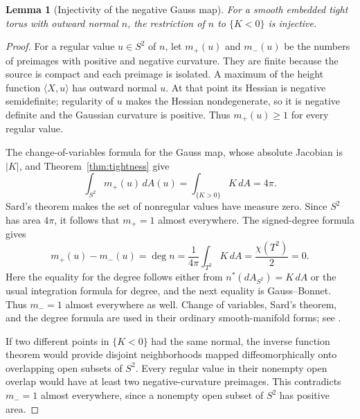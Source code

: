 \documentclass[11pt]{amsart}
\newtheorem{lemma}[theorem]{Lemma}
\theoremstyle{definition}
\begin{document}
\begin{lemma}[Injectivity of the negative Gauss map]\label{lem:gauss}
For a smooth embedded tight torus with outward normal $n$, the
restriction of $n$ to $\{K<0\}$ is injective.
\end{lemma}
\begin{proof}
For a regular value $u\in S^2$ of $n$, let $m_+(u)$ and $m_-(u)$
be the numbers of preimages with positive and negative curvature.
They are finite because the source is compact and each preimage
is isolated. A maximum of the height function $\langle X,u\rangle$
has outward normal $u$. At that point its Hessian is negative
semidefinite; regularity of $u$ makes the Hessian nondegenerate,
so it is negative definite and the Gaussian curvature is positive.
Thus $m_+(u)\ge1$ for every regular value.

The change-of-variables formula for the Gauss map, whose absolute
Jacobian is $|K|$, and Theorem~\ref{thm:tightness} give
\[
 \int_{S^2}m_+(u)\,dA(u)=\int_{\{K>0\}}K\,dA=4\pi .
\]
Sard's theorem makes the set of nonregular values have measure zero.
Since $S^2$ has area $4\pi$, it follows that $m_+=1$ almost
everywhere. The signed-degree formula gives
\[
 m_+(u)-m_-(u)=\deg n
 =\frac1{4\pi}\int_{T^2}K\,dA=\frac{\chi(T^2)}2=0.
\]
Here the equality for the degree follows either from
$n^*(dA_{S^2})=K\,dA$ or the usual integration formula for degree,
and the next equality is Gauss--Bonnet. Thus $m_-=1$ almost
everywhere as well. Change of variables, Sard's theorem, and the
degree formula are used in their ordinary smooth-manifold forms;
see \cite[Chapters~6 and~17]{Lee}.

If two different points in $\{K<0\}$ had the same normal, the inverse
function theorem would provide disjoint neighborhoods mapped
diffeomorphically onto overlapping open subsets of $S^2$.
Every regular value in their nonempty open overlap would have at
least two negative-curvature preimages. This contradicts $m_-=1$
almost everywhere, since a nonempty open subset of $S^2$ has
positive area.
\end{proof}
\end{document}
